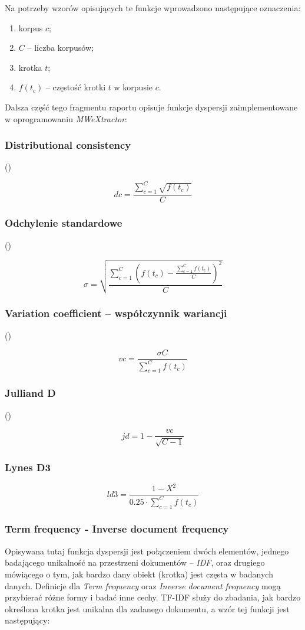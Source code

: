 \documentclass[11pt,a4paper]{llncs}
\begin{document}
Na potrzeby wzorów opisujących te funkcje wprowadzono następujące oznaczenia:
\begin{enumerate}
 \item korpus $ c $;
 \item $ C $ -- liczba korpusów;
 \item krotka $ t $;
 \item $ f(t_{c}) $ -- częstość krotki $ t $ w korpusie $ c $.
\end{enumerate}

Dalsza część tego fragmentu raportu opisuje funkcje dyspersji zaimplementowane w oprogramowaniu \emph{MWeXtractor}:

\subsubsection{Distributional consistency}(\cite[str. 7]{dispersions})

$$ dc = \frac{ \sum_{c=1}^{C} \sqrt{f(t_{c})} }{C} $$

\subsubsection{Odchylenie standardowe}(\cite[str. 6]{dispersions})

$$ \sigma = \sqrt{\frac{\sum_{c=1}^{C}(f(t_{c}) - \frac{ \sum_{c=1}^{C} f(t_{c}) }{C} )^2}{C}} $$

\subsubsection{Variation coefficient -- współczynnik wariancji}(\cite[str. 6]{dispersions})

$$ vc = \frac{\sigma C}{\sum_{c=1}^{C} f(t_{c})} $$

\subsubsection{Julliand D}(\cite[str. 6]{dispersions})

$$ jd = 1 - \frac{vc}{\sqrt{C-1}} $$

\subsubsection{Lynes D3}

$$ ld3 = \frac{ 1 - X^{2} }{ 0.25 \cdot \sum_{c=1}^{C} f(t_{c}) } $$

\subsubsection{Term frequency - Inverse document frequency}
Opisywana tutaj funkcja dyspersji jest połączeniem dwóch elementów, jednego badającego unikalność na przestrzeni dokumentów -- \emph{IDF}, oraz drugiego mówiącego o tym, jak bardzo dany obiekt (krotka) jest częsta w badanych danych.
Definicje dla \emph{Term frequency} oraz \emph{Inverse document frequency} mogą przybierać różne formy i badać inne cechy.
TF-IDF służy do zbadania, jak bardzo określona krotka jest unikalna dla zadanego dokumentu, a wzór tej funkcji jest następujący:
\end{document}
